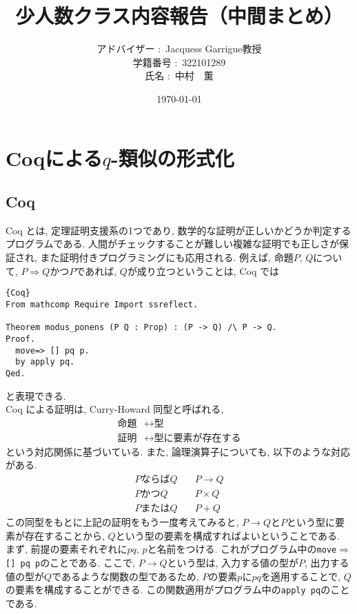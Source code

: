\documentclass[11pt]{jarticle}
\theoremstyle{mystyle}
\newcommand{\Lra}{\Longrightarrow}
\newcommand{\ra}{\rightarrow}
\newcommand{\0}{\textbf{0}}
\newcommand{\1}{\textbf{1}}
\newcommand{\2}{\textbf{2}}
\begin{document}
\title{少人数クラス内容報告（中間まとめ）}
\author{アドバイザー $\colon$ Jacquess Garrigue教授\\
           学籍番号 $\colon$ 322101289\\
           氏名 $\colon$ 中村　薫}
\date{\today}
\maketitle
\tableofcontents
\section{Coqによる$q$-類似の形式化}
\subsection{Coq}
Coq とは, 定理証明支援系の1つであり, 数学的な証明が正しいかどうか判定するプログラムである. 人間がチェックすることが難しい複雑な証明でも正しさが保証され, また証明付きプログラミングにも応用される. 例えば, 命題$P$, $Q$について, $P \Lra Q$かつ$P$であれば, $Q$が成り立つということは, Coq では
\begin{lstlisting}{Coq}
From mathcomp Require Import ssreflect.

Theorem modus_ponens (P Q : Prop) : (P -> Q) /\ P -> Q.
Proof.
  move=> [] pq p.
  by apply pq.
Qed.
\end{lstlisting}
と表現できる. \\
Coq による証明は, Curry-Howard 同型と呼ばれる, 
\begin{align*}
  \text{命題} &\leftrightarrow \text{型} \\
  \text{証明} &\leftrightarrow \text{型に要素が存在する}
\end{align*}
という対応関係に基づいている. また, 論理演算子についても, 以下のような対応がある. 
\begin{align*}
  P \text{ならば} Q &\quad P \rightarrow Q \\
  P \text{かつ} Q &\quad P \times Q \\
  P \text{または} Q &\quad  P + Q
\end{align*}
この同型をもとに上記の証明をもう一度考えてみると, $P \ra Q$と$P$という型に要素が存在することから, $Q$という型の要素を構成すればよいということである. \\
まず, 前提の要素それぞれに$pq$, $p$と名前をつける. これがプログラム中の{\tt move$\Rightarrow$ [] pq p}のことである. 
ここで, $P \to Q$という型は, 入力する値の型が$P$, 出力する値の型が$Q$であるような関数の型であるため, $P$の要素$p$に$pq$を適用することで, $Q$の要素を構成することができる. この関数適用がプログラム中の{\tt apply pq}のことである. 
\end{document}
